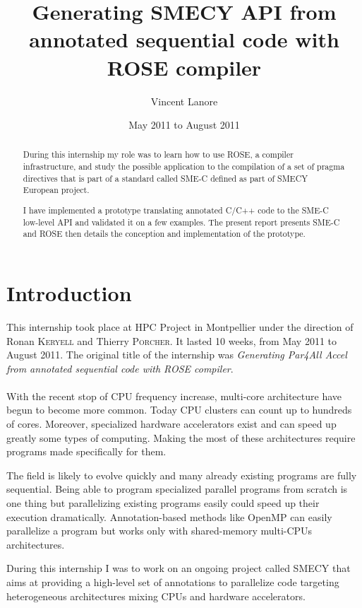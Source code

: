 \documentclass[a4paper]{article}
\title{Generating SMECY API from annotated sequential code with ROSE compiler}
\author{Vincent \sc Lanore}
\date{May 2011 to August 2011}
\begin{document}
	\maketitle
	
	\begin{abstract}
		During this internship my role was to learn how to use ROSE, a
        compiler infrastructure, and study the possible application to the
        compilation of a set of pragma directives that is part of a
        standard called SME-C defined as part of SMECY European project.
		
		I have implemented a prototype translating annotated C/C++ code to the SME-C low-level API and validated it on a few examples. The present report presents SME-C and ROSE then details the conception and implementation of the prototype.
	\end{abstract}
	
	\newpage
	\tableofcontents
	\newpage
	
\section*{Introduction}
	This internship took place at HPC Project in Montpellier under the
    direction of Ronan \textsc{Keryell} and Thierry \textsc{Porcher}. It lasted 10 weeks, from May 2011 to August 2011. The original title of the internship was \emph{Generating Par4All Accel from annotated sequential code with ROSE compiler}.
	
	\paragraph{}With the recent stop of CPU frequency increase, multi-core architecture have begun to become more common. Today CPU clusters can count up to hundreds of cores. Moreover, specialized hardware accelerators exist and can speed up greatly some types of computing.  Making the most of these architectures require programs made specifically for them. 
	
	The field is likely to evolve quickly and many already existing programs are fully sequential. Being able to program specialized parallel programs from scratch is one thing but parallelizing existing programs easily could speed up their execution dramatically. Annotation-based methods like OpenMP can easily parallelize a program but works only with shared-memory multi-CPUs architectures.
	
	During this internship I was to work on an ongoing project called SMECY that aims at providing a high-level set of annotations to parallelize code targeting heterogeneous architectures mixing CPUs and hardware accelerators.
	
\end{document}
